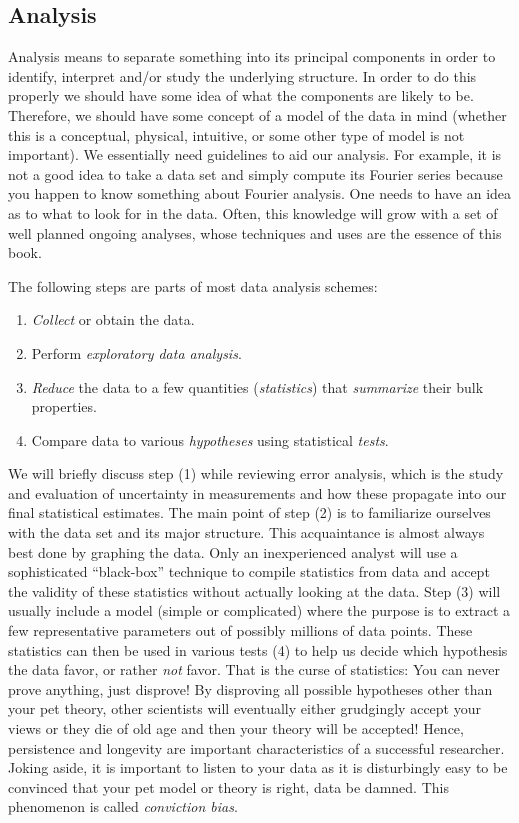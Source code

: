 \subsection{Analysis}

	Analysis means to separate something into its principal components in order to identify, interpret and/or study the 
underlying structure.  In order to do this properly we should have some idea of what the 
components are likely to be.  Therefore, we should have some concept of a model of the data in mind 
(whether this is a conceptual, physical, intuitive, or some other type of model is not important).  We 
essentially need guidelines to aid our analysis.  For example, it is not a good idea to take 
a data set and simply compute its Fourier series because you happen to know something about Fourier analysis.  One 
needs to have an idea as to what to look for in the data.  Often, this knowledge will grow with 
a set of well planned ongoing analyses, whose techniques and uses are the essence of this book.

The following steps are parts of most data analysis schemes:
\begin{enumerate}
	\item \emph{Collect} or obtain the data.
	\item Perform \emph{exploratory data analysis}.
	\item \emph{Reduce} the data to a few quantities (\emph{statistics}) that \emph{summarize} their bulk properties.
	\item Compare data to various \emph{hypotheses} using statistical \emph{tests}.
\end{enumerate}
We will briefly discuss step (1) while reviewing error analysis, which is the study and evaluation of 
uncertainty in measurements and how these propagate into our final statistical estimates.  The main point of
step (2) is to familiarize ourselves with the data set and its major structure.  
This acquaintance is almost always best done by graphing the data.  Only an inexperienced analyst will use a 
sophisticated ``black-box'' technique to compile statistics from data and accept the validity of these statistics 
without actually looking at the data.  Step (3) will usually include a model (simple or 
complicated) where the purpose is to extract a few representative parameters out of possibly 
millions of data points.  These statistics can then be used in various tests (4) to help us decide 
which hypothesis the data favor, or rather \emph{not} favor.  That is the curse of statistics: You can never 
prove anything, just disprove!  By disproving all possible hypotheses other than your pet theory, 
other scientists will eventually either grudgingly accept your views or they die of old age and 
then your theory will be accepted!  Hence, persistence and longevity are important characteristics of a successful researcher.
Joking aside, it is important to listen to your data as it is disturbingly easy to be convinced that your pet model
or theory is right, data be damned.  This phenomenon is called \emph{conviction bias}.

